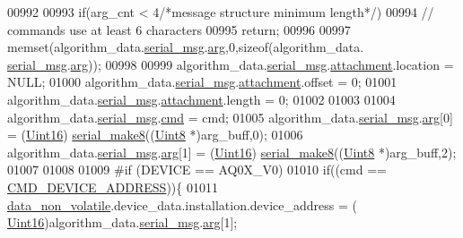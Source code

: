 \begin{DoxyCode}
{{{{{00992 
00993         \textcolor{keywordflow}{if}(arg\_cnt < 4\textcolor{comment}{/*message structure minimum length*/})
00994             \textcolor{comment}{//  commands use at least 6 characters}
00995             \textcolor{keywordflow}{return};
00996 
00997         memset(algorithm\_data.\hyperlink{a00016_afcf5f557aea688aad985eec15269c1da}{serial\_msg}.\hyperlink{a00031_af7d6f762438c80072bd9dc0e4dd4ae1e}{arg},0,\textcolor{keyword}{sizeof}(algorithm\_data.
      \hyperlink{a00016_afcf5f557aea688aad985eec15269c1da}{serial\_msg}.\hyperlink{a00031_af7d6f762438c80072bd9dc0e4dd4ae1e}{arg}));
00998 
00999         algorithm\_data.\hyperlink{a00016_afcf5f557aea688aad985eec15269c1da}{serial\_msg}.\hyperlink{a00031_a040f6d5d58d18d8aeaf447eda7f50172}{attachment}.location   = NULL;
01000         algorithm\_data.\hyperlink{a00016_afcf5f557aea688aad985eec15269c1da}{serial\_msg}.\hyperlink{a00031_a040f6d5d58d18d8aeaf447eda7f50172}{attachment}.offset     = 0;
01001         algorithm\_data.\hyperlink{a00016_afcf5f557aea688aad985eec15269c1da}{serial\_msg}.\hyperlink{a00031_a040f6d5d58d18d8aeaf447eda7f50172}{attachment}.length     = 0;
01002 
01003 
01004         algorithm\_data.\hyperlink{a00016_afcf5f557aea688aad985eec15269c1da}{serial\_msg}.\hyperlink{a00031_a13c351e37c82b2434e5ce4421012ffd6}{cmd}                   = cmd;
01005         algorithm\_data.\hyperlink{a00016_afcf5f557aea688aad985eec15269c1da}{serial\_msg}.\hyperlink{a00031_af7d6f762438c80072bd9dc0e4dd4ae1e}{arg}[0]                = (\hyperlink{a00072_a59a9f6be4562c327cbfb4f7e8e18f08b}{Uint16})
      \hyperlink{a00031_aa76f5237babd71f1484bb2dbc6aa0f8d}{serial\_make8}((\hyperlink{a00072_af84840501dec18061d18a68c162a8fa2}{Uint8} *)arg\_buff,0);
01006         algorithm\_data.\hyperlink{a00016_afcf5f557aea688aad985eec15269c1da}{serial\_msg}.\hyperlink{a00031_af7d6f762438c80072bd9dc0e4dd4ae1e}{arg}[1]                = (\hyperlink{a00072_a59a9f6be4562c327cbfb4f7e8e18f08b}{Uint16})
      \hyperlink{a00031_aa76f5237babd71f1484bb2dbc6aa0f8d}{serial\_make8}((\hyperlink{a00072_af84840501dec18061d18a68c162a8fa2}{Uint8} *)arg\_buff,2);
01007 
01008 
01009 \textcolor{preprocessor}{#if (DEVICE == AQ0X\_V0)}
01010         \textcolor{keywordflow}{if}((cmd == \hyperlink{a00021_a7c6a5f4023cb02d02f2ded23147be425}{CMD\_DEVICE\_ADDRESS}))\{
01011            \hyperlink{a00060_a76ac5f917f5308dcd83de0d7c94559fb}{data\_non\_volatile}.device\_data.installation.device\_address = (
      \hyperlink{a00072_a59a9f6be4562c327cbfb4f7e8e18f08b}{Uint16})algorithm\_data.\hyperlink{a00016_afcf5f557aea688aad985eec15269c1da}{serial\_msg}.\hyperlink{a00031_af7d6f762438c80072bd9dc0e4dd4ae1e}{arg}[1];
}}}}}
\end{DoxyCode}
